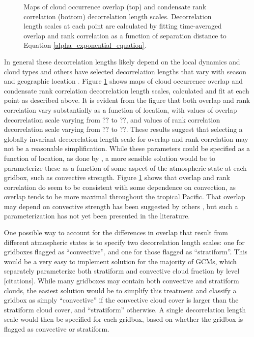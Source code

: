 \begin{figure}
\centering
\caption{Maps of cloud occurrence overlap (top) and condensate rank correlation (bottom) decorrelation length scales. Decorrelation length scales at each point are calculated by fitting time-averaged overlap and rank correlation as a function of separation distance to Equation \ref{alpha_exponential_equation}.}
\label{sgi_overlap_map}
\end{figure}

In general these decorrelation lengths likely depend on the local dynamics and cloud types \citep[e.g.,][]{pincus_et_al_2005} and others have selected decorrelation lengths that vary with season and geographic location \citep[e.g.,][]{raisanen_et_al_2004, oreopoulos_et_al_2012}. Figure \ref{sgi_overlap_map} shows maps of cloud occurrence overlap and condensate rank correlation decorrelation length scales, calculated and fit at each point as described above. It is evident from the figure that both overlap and rank correlation vary substantially as a function of location, with values of overlap decorrelation scale varying from ?? to ??, and values of rank correlation decorrelation scale varying from ?? to ??. These results suggest that selecting a globally invariant decorrelation length scale for overlap and rank correlation may not be a reasonable simplification. While these parameters could be specified as a function of location, as done by \cite{oreopoulos_et_al_2012}, a more sensible solution would be to parameterize these as a function of some aspect of the atmospheric state at each gridbox, such as convective strength. Figure \ref{sgi_overlap_map} shows that overlap and rank correlation do seem to be consistent with some dependence on convection, as overlap tends to be more maximal throughout the tropical Pacific. That overlap may depend on convective strength has been suggested by others \citep{pincus_et_al_2005}, but such a parameterization has not yet been presented in the literature.


One possible way to account for the differences in overlap that result from different atmospheric states is to specify two decorrelation length scales: one for gridboxes flagged as ``convective'', and one for those flagged as ``stratiform''. This would be a very easy to implement solution for the majority of GCMs, which separately parameterize both stratiform and convective cloud fraction by level [citations]. While many gridboxes may contain both convective and stratiform clouds, the easiest solution would be to simplify this treatment and classify a gridbox as simply ``convective'' if the convective cloud cover is larger than the stratiform cloud cover, and ``stratiform'' otherwise. A single decorrelation length scale would then be specified for each gridbox, based on whether the gridbox is flagged as convective or stratiform.

